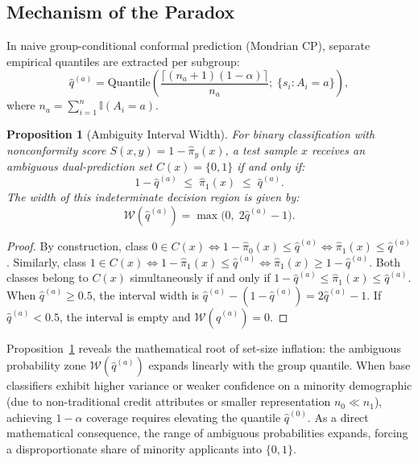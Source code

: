 \documentclass[conference]{IEEEtran}
\newtheorem{proposition}{Proposition}
\begin{document}
\subsection{Mechanism of the Paradox}
In naive group-conditional conformal prediction (Mondrian CP), separate empirical quantiles are extracted per subgroup:
\begin{equation}
\hat{q}^{(a)} = \text{Quantile}\left( \frac{\lceil (n_a + 1)(1-\alpha) \rceil}{n_a};\; \{s_i : A_i = a\} \right),
\end{equation}
where $n_a = \sum_{i=1}^n \mathbb{I}(A_i = a)$.

\begin{proposition}[Ambiguity Interval Width]
\label{prop:ambiguity}
For binary classification with nonconformity score $S(x, y) = 1 - \hat{\pi}_y(x)$, a test sample $x$ receives an ambiguous dual-prediction set $C(x) = \{0, 1\}$ if and only if:
\begin{equation}
1 - \hat{q}^{(a)} \;\le\; \hat{\pi}_1(x) \;\le\; \hat{q}^{(a)}.
\end{equation}
The width of this indeterminate decision region is given by:
\begin{equation}
\mathcal{W}(\hat{q}^{(a)}) = \max\bigl(0,\; 2\hat{q}^{(a)} - 1\bigr).
\end{equation}
\end{proposition}

\begin{proof}
By construction, class $0 \in C(x) \iff 1 - \hat{\pi}_0(x) \le \hat{q}^{(a)} \iff \hat{\pi}_1(x) \le \hat{q}^{(a)}$. Similarly, class $1 \in C(x) \iff 1 - \hat{\pi}_1(x) \le \hat{q}^{(a)} \iff \hat{\pi}_1(x) \ge 1 - \hat{q}^{(a)}$. Both classes belong to $C(x)$ simultaneously if and only if $1 - \hat{q}^{(a)} \le \hat{\pi}_1(x) \le \hat{q}^{(a)}$. When $\hat{q}^{(a)} \ge 0.5$, the interval width is $\hat{q}^{(a)} - (1 - \hat{q}^{(a)}) = 2\hat{q}^{(a)} - 1$. If $\hat{q}^{(a)} < 0.5$, the interval is empty and $\mathcal{W}(\hat{q}^{(a)}) = 0$.
\end{proof}

Proposition~\ref{prop:ambiguity} reveals the mathematical root of set-size inflation: the ambiguous probability zone $\mathcal{W}(\hat{q}^{(a)})$ expands linearly with the group quantile. When base classifiers exhibit higher variance or weaker confidence on a minority demographic (due to non-traditional credit attributes or smaller representation $n_0 \ll n_1$), achieving $1 - \alpha$ coverage requires elevating the quantile $\hat{q}^{(0)}$. As a direct mathematical consequence, the range of ambiguous probabilities expands, forcing a disproportionate share of minority applicants into $\{0, 1\}$.
\end{document}
